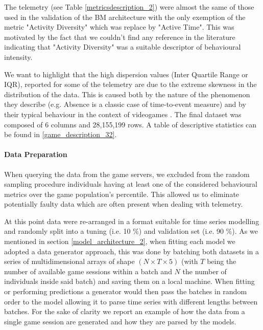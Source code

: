 The telemetry (see Table \ref{metricsdescription_2}) were almost the same of those used in the validation of the BM architecture with the only exemption of the metric "Activity Diversity" which was replace by "Active Time". This was motivated by the fact that we couldn't find any reference in the literature indicating that "Activity Diversity" was a suitable descriptor of behavioural intensity. 



We want to highlight that the high dispersion values (Inter Quartile Range  or IQR), reported for some of the telemetry are due to the extreme skewness in the distribution of the data. This is caused both by the nature of the phenomenon they describe (e.g. Absence is a classic case of time-to-event measure) and by their typical behaviour in the context of videogames \cite{bauckhage2012players}. The final dataset was composed of 6 columns and 28,155,199 rows. A table of descriptive statistics can be found in \ref{game_description_32}.



\paragraph*{Data Preparation} When querying the data from the game servers, we excluded from the random sampling procedure individuals having at least one of the considered behavioural metrics over the game population's  percentile. This allowed us to eliminate potentially faulty data which are often present when dealing with telemetry. 

At this point data were re-arranged in a format suitable for time series modelling and randomly split into a tuning (i.e. 10 \%) and validation set (i.e. 90 \%). As we mentioned in section \ref{model_architecture_2}, when fitting each model we adopted a data generator approach, this was done by batching both datasets in a series of multidimensional arrays of shape $(N \times T \times 5)$ (with $T$ being the number of available game sessions within a batch and $N$ the number of individuals inside said batch) and saving them on a local machine. When fitting or performing predictions a generator would then pass the batches in random order to the model allowing it to parse time series with different lengths between batches. For the sake of clarity we report an example of how the data from a single game session are generated and how they are parsed by the models.

